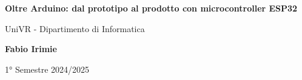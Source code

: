 \begin{titlepage}
	\begin{center}
		\vspace*{1cm}

		\Huge
    \textbf{Oltre Arduino: dal prototipo al prodotto con microcontroller ESP32}

		\vspace{0.5cm}
		\LARGE
		UniVR - Dipartimento di Informatica

		\vspace{1.5cm}

		\textbf{Fabio Irimie}

		\vfill


		\vspace{0.8cm}


		1° Semestre 2024/2025

	\end{center}
\end{titlepage}
